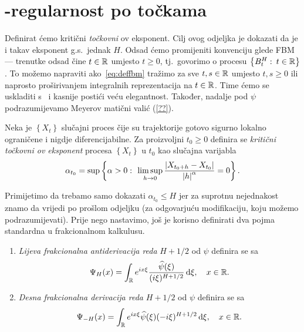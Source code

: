 \documentclass[main.tex]{subfiles}
\begin{document}
\nocite{*}

\section{\holder -regularnost po točkama}\label{sec:holpo}
Definirat ćemo kritični \emph{točkovni} \holder ov eksponent.
Cilj ovog odjeljka je dokazati da je i takav eksponent g.s.\ jednak \( H \). Odsad ćemo promijeniti konvenciju glede FBM ---
trenutke odsad čine \( t \in \mathbb{R} \) umjesto \( t \ge 0 \), tj.\ govorimo
o procesu \( \left\{ B^H_t \, \colon \, t \in \mathbb{R} \right\} \).
To možemo napraviti ako~\eqref{eq:deffbm} tražimo
za sve \( t,s \in \mathbb{R} \) umjesto \( t,s \ge 0 \) ili
naprosto proširivanjem integralnih reprezentacija na \( t \in \mathbb{R} \).
Time ćemo se uskladiti s~\cite{ayache} i kasnije
postići veću elegantnost. Također,
nadalje pod \( \psi \) podrazumijevamo
Meyerov matični valić (\ref{??}).


\begin{definicija}\label{def:holpo}
	Neka je \( \left\{ X_t \right\} \) slučajni proces čije su trajektorije gotovo sigurno
	lokalno ograničene i nigdje diferencijabilne. Za proizvoljni
	\( t_0 \ge 0 \) definira se \emph{kritični točkovni \holder ov eksponent} procesa
	\( \left\{ X_t \right\} \) u \( t_0 \) kao slučajna varijabla
	\begin{equation}
		\alpha_{t_0} = \sup \left\{ \alpha > 0 \, \colon \,
		\limsup\limits_{h \rightarrow 0} \frac{\left| {X_{t_0+h}-X_{t_0}} \right|}{\left| {h} \right|^\alpha} = 0
		\right\}.
	\end{equation}
\end{definicija}

Primijetimo da trebamo samo dokazati \( \alpha_{t_0} \le H \)
jer za suprotnu nejednakost znamo da vrijedi po prošlom odjeljku (za odgovarjuću
modifikaciju, koju možemo podrazumijevati).
Prije nego nastavimo, još je korisno definirati dva pojma
standardna u frakcionalnom kalkulusu.

\begin{definicija}
	\begin{enumerate}
		\item \emph{Lijeva frakcionalna antiderivacija reda} \( H+1/2 \) od \( \psi \) definira se sa
		      \begin{equation}
			      \Psi_H(x) = \int_{\mathbb{R}} e^{ix\xi} \frac{\widehat{\psi}(\xi)}{(i\xi)^{H+1/2}} \,\mathrm d \xi, \quad x \in \mathbb{R}.
		      \end{equation}
		\item \emph{Desna frakcionalna derivacija reda} \( H+1/2 \) od \( \psi \) definira se sa
		      \begin{equation}
			      \Psi_{-H}(x)= \int_{\mathbb{R}} e^{ix\xi}\widehat{\psi}(\xi)(-i\xi)^{H+1/2} \,\mathrm d \xi, \quad x \in \mathbb{R}.
		      \end{equation}
	\end{enumerate}
\end{definicija}
\end{document}
